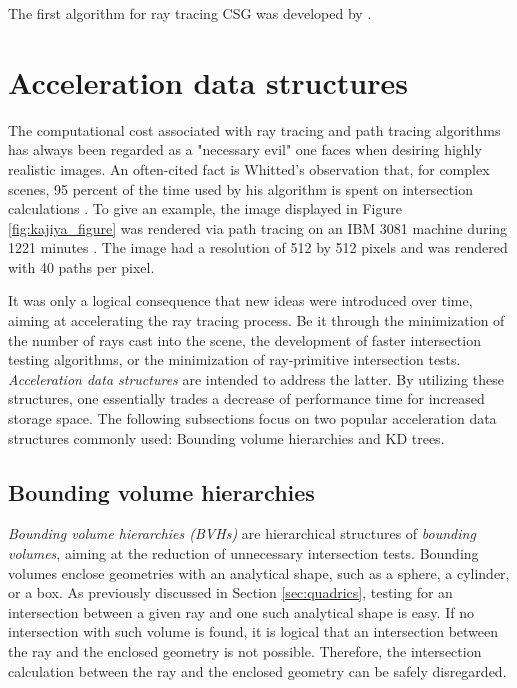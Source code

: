 The first algorithm for ray tracing CSG was developed by \cite{roth1982ray}. 


\section{Acceleration data structures} \label{sec:acceleration}
The computational cost associated with ray tracing and path tracing algorithms has always been regarded as a "necessary evil" one faces when desiring highly realistic images. An often-cited fact is Whitted's observation that, for complex scenes, 95 percent of the time used by his algorithm is spent on intersection calculations \cite[p 349]{whitted1979improved}. To give an example, the image displayed in Figure \ref{fig:kajiya_figure} was rendered via path tracing on an IBM 3081 machine during 1221 minutes \cite[p 149]{kajiya1986rendering}. The image had a resolution of 512 by 512 pixels and was rendered with 40 paths per pixel.

It was only a logical consequence that new ideas were introduced over time, aiming at accelerating the ray tracing process. Be it through the minimization of the number of rays cast into the scene, the development of faster intersection testing algorithms, or the minimization of ray-primitive intersection tests. \emph{Acceleration data structures} are intended to address the latter. By utilizing these structures, one essentially trades a decrease of performance time for increased storage space. The following subsections focus on two popular acceleration data structures commonly used: Bounding volume hierarchies and KD trees.

\subsection{Bounding volume hierarchies}

\emph{Bounding volume hierarchies (BVHs)} are hierarchical structures of \emph{bounding volumes}, aiming at the reduction of unnecessary intersection tests. Bounding volumes enclose geometries with an analytical shape, such as a sphere, a cylinder, or a box. As previously discussed in Section \ref{sec:quadrics}, testing for an intersection between a given ray and one such analytical shape is easy. If no intersection with such volume is found, it is logical that an intersection between the ray and the enclosed geometry is not possible. Therefore, the intersection calculation between the ray and the enclosed geometry can be safely disregarded. 

